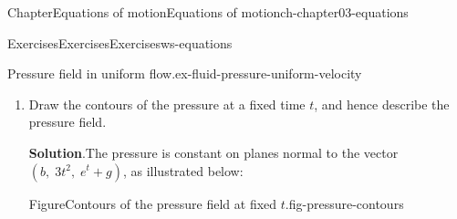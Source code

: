\documentclass[oneside,10pt,]{book}
\newcommand{\blocktitlefont}{\relax}
\numberwithin{equation}{section}
\newcommand{\pd}[2]{\frac{\partial#1}{\partial#2}}
\newcommand{\bu}{\boldsymbol{u}}
\newcommand{\bk}{\boldsymbol{k}}
\begin{document}
\begin{chapterptx}{Chapter}{Equations of motion}{}{Equations of motion}{}{}{ch-chapter03-equations}
\begin{exercises-section}{Exercises}{Exercises}{}{Exercises}{}{}{ws-equations}
\begin{divisionexercise}{5}{Pressure field in uniform flow.}{}{ex-fluid-pressure-uniform-velocity}
\begin{enumerate}[font=\bfseries,label=(\alph*),ref=\alph*]
where%
\begin{equation*}
\pd{\bu}{t}=(b, \; 3t^2, \; e^t).
\end{equation*}
Hence, the pressure is given by solving the equation,%
\begin{equation*}
\nabla p = -\rho \pd{\bu}{t} - \rho g \bk
= -\rho (\, b, \; 3t^2, \; e^t + g \,),
\end{equation*}
which is a vector equation. Splitting into components, we obtain%
\begin{equation*}
\frac{\partial p}{\partial x} = -\rho b, \quad
\frac{\partial p}{\partial y} = -3\rho t^2, \quad
\frac{\partial p}{\partial z} = -\rho (e^t + g).
\end{equation*}
Solving sequentially, the first equation gives%
\begin{equation*}
p = -\rho b x + f_1(y,z,t).
\end{equation*}
Substituting into the second equation,%
\begin{equation*}
\frac{\partial f_1}{\partial y} = -3\rho t^2
\;\;\Rightarrow\;\;
f_1 = -3\rho t^2 y + f_2(z,t),
\end{equation*}
%
\begin{equation*}
p = -\rho b x - 3\rho t^2 y + f_2(z,t).
\end{equation*}
The third equation then implies%
\begin{equation*}
\frac{\partial f_2}{\partial z} = -\rho(e^t+g)
\;\;\Rightarrow\;\;
f_2 = -\rho(e^t+g)z + f_3(t),
\end{equation*}
%
\begin{equation*}
p = -\rho b x - 3\rho t^2 y - \rho(e^t+g)z + f_3(t).
\end{equation*}
Using \(p = p_0\) at the origin gives \(f_3(t) = p_0\) for all \(t\). Hence%
\begin{equation*}
p = p_0 - \rho \big(bx + 3t^2 y + (e^t + g)z \big).
\end{equation*}
%
\item{}Draw the contours of the pressure at a fixed time \(t\), and hence describe the pressure field.%
\par\smallskip%
\noindent\textbf{\blocktitlefont Solution}.\hypertarget{ex-fluid-pressure-uniform-velocity-4-2}{}\quad{}The pressure is constant on planes normal to the vector \((b, \; 3t^2, \; e^t + g)\), as illustrated below:%
\begin{figureptx}{Figure}{Contours of the pressure field at fixed \(t\).}{fig-pressure-contours}{}%
\begin{image}{0}{1}{0}{}%

\end{image}
\end{figureptx}
\end{enumerate}
\end{divisionexercise}
\end{exercises-section}
\end{chapterptx}
\end{document}

